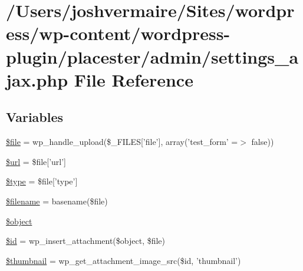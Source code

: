\hypertarget{settings__ajax_8php}{
\section{/Users/joshvermaire/Sites/wordpress/wp-\/content/wordpress-\/plugin/placester/admin/settings\_\-ajax.php File Reference}
\label{d5/d83/settings__ajax_8php}
}
\subsection*{Variables}
\begin{DoxyCompactItemize}
\item 
\hyperlink{settings__ajax_8php_aa1bfbd27060176201b271918dff57e8f}{\$file} = wp\_\-handle\_\-upload(\$\_\-FILES\mbox{[}'file'\mbox{]}, array('test\_\-form' =$>$ false))
\item 
\hyperlink{settings__ajax_8php_acf215f34a917d014776ce684a9ee8909}{\$url} = \$file\mbox{[}'url'\mbox{]}
\item 
\hyperlink{settings__ajax_8php_a9a4a6fba2208984cabb3afacadf33919}{\$type} = \$file\mbox{[}'type'\mbox{]}
\item 
\hyperlink{settings__ajax_8php_a0722441477f957078ee2437054556cbc}{\$filename} = basename(\$file)
\item 
\hyperlink{settings__ajax_8php_a52123b83a1952a68c5513e47d59ec4a6}{\$object}
\item 
\hyperlink{settings__ajax_8php_ae97941710d863131c700f069b109991e}{\$id} = wp\_\-insert\_\-attachment(\$object, \$file)
\item 
\hyperlink{settings__ajax_8php_a7f835c9ddb57cb4a7f20c89382f45dab}{\$thumbnail} = wp\_\-get\_\-attachment\_\-image\_\-src(\$id, 'thumbnail')
\end{DoxyCompactItemize}



